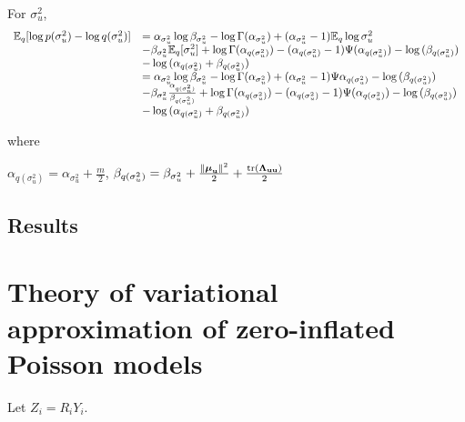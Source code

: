\documentclass{amsart}
\begin{document}
%
%
%
%

For $\sigma^2_u$,
$$
\begin{array}{ll}
{\mathbb E}_q[\log{p(\sigma^2_u)} - \log{q(\sigma^2_u)}] &=
\alpha_{\sigma^2_u} \log{\beta_{\sigma^2_u}} - \log{\Gamma{(\alpha_{\sigma^2_u})}} +
(\alpha_{\sigma^2_u} - 1) {\mathbb E}_q	\log{\sigma^2_u}\\
&- \beta_{\sigma^2_u} {\mathbb E}_q [\sigma^2_u] +
\log{\Gamma(\alpha_{q(\sigma^2_u)})} - (\alpha_{q(\sigma^2_u)} - 1) \Psi{(\alpha_{q(\sigma^2_u)})} - \log{(\beta_{q(\sigma^2_u)})}\\
&- \log{(\alpha_{q(\sigma^2_u)} + \beta_{q(\sigma^2_u)})}\\
&=\alpha_{\sigma^2_u} \log{\beta_{\sigma^2_u}} - \log{\Gamma{(\alpha_{\sigma^2_u})}} +
(\alpha_{\sigma^2_u} - 1) \Psi{\alpha_{q(\sigma^2_u)}} - \log{(\beta_{q(\sigma^2_u)})} \\
&- \beta_{\sigma^2_u} \frac{\alpha_{q(\sigma^2_u)}}{\beta_{q(\sigma^2_u)}} + 
\log{\Gamma(\alpha_{q(\sigma^2_u)})} - (\alpha_{q(\sigma^2_u)} - 1) \Psi{(\alpha_{q(\sigma^2_u)})} - \log{(\beta_{q(\sigma^2_u)})}\\
&- \log{(\alpha_{q(\sigma^2_u)} + \beta_{q(\sigma^2_u)})}
\end{array}
$$

where

$\alpha_{q(\sigma^2_u)} = \alpha_{\sigma^2_u} + \frac{m}{2}$,
$\beta_{q(\sigma^2_u)} = \beta_{\sigma^2_u} + \frac{\|{\boldsymbol \mu}_{\bf u}\|^2}{2} + \frac{\text{tr}{({\boldsymbol\Lambda}_{{\bf u}{\bf u}})}}{2}$

\subsection{Results}

\section{Theory of variational approximation of zero-inflated Poisson models}
Let $Z_i = R_i Y_i$.
\end{document}
